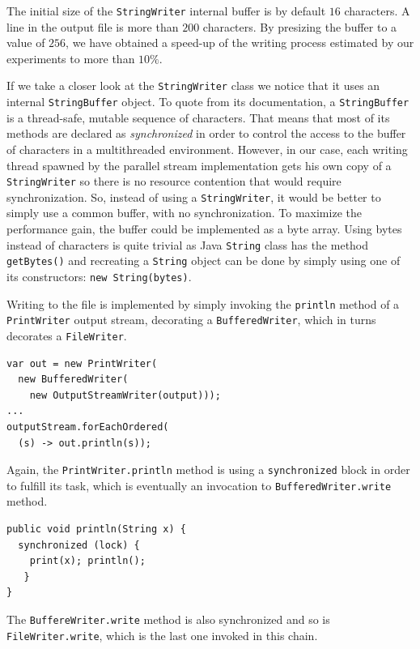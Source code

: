 \documentclass[a4paper,twoside]{article}
\begin{document}
The initial size of the {\tt StringWriter} internal buffer is by default $16$ characters. A line in the output file is more than $200$ characters. By presizing the buffer to a value of $256$, we have obtained a speed-up of the writing process estimated by our experiments to more than $10\%$.

If we take a closer look at the {\tt StringWriter} class we notice that it uses an internal {\tt StringBuffer} object. To quote from its documentation, a {\tt StringBuffer} is  a thread-safe, mutable sequence of characters. That means that most of its methods are declared as {\it synchronized} in order to control the access to the buffer of characters in a multithreaded environment.
However, in our case, each writing thread spawned by the parallel stream implementation gets his own copy of a {\tt StringWriter} so there is no resource contention that would require synchronization.
So, instead of using a {\tt StringWriter}, it would be better to simply use a common buffer, with no synchronization. To maximize the performance gain, the buffer could be implemented as a byte array. 
Using bytes instead of characters is quite trivial as Java {\tt String} class has the method {\tt getBytes()} and recreating a {\tt String} object can be done by simply using one of its constructors: {\tt new String(bytes)}.

Writing to the file is implemented by simply invoking the {\tt println} method of a {\tt PrintWriter} output stream, decorating a {\tt BufferedWriter}, which in turns decorates a {\tt FileWriter}.
\begin{verbatim}
var out = new PrintWriter(
  new BufferedWriter(
    new OutputStreamWriter(output)));
...    
outputStream.forEachOrdered(
  (s) -> out.println(s));
\end{verbatim}

Again, the {\tt PrintWriter.println} method is using a {\tt synchronized} block in order to fulfill its task, which is eventually an invocation to {\tt BufferedWriter.write} method.
\begin{verbatim}
public void println(String x) {
  synchronized (lock) {
    print(x); println();
   }
}
\end{verbatim}
The {\tt BuffereWriter.write} method is also synchronized and so is {\tt FileWriter.write}, which is the last one invoked in this chain.
\end{document}
